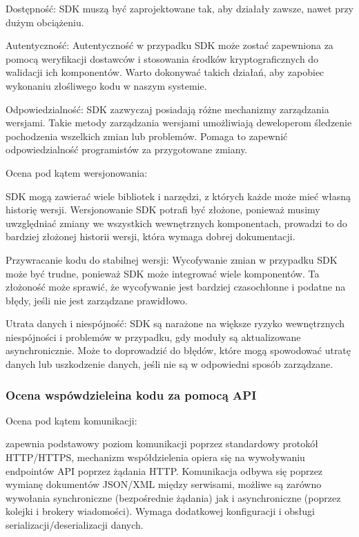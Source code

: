 \documentclass[runningheads,12pt]{llncs}
\begin{document}
Dostępność: SDK muszą być zaprojektowane tak, aby działały zawsze, nawet przy dużym obciążeniu. ~\cite[para 6]{azure2020}

Autentyczność: Autentyczność w przypadku SDK może zostać zapewniona za pomocą weryfikacji dostawców i stosowania środków kryptograficznych do walidacji ich komponentów. Warto dokonywać takich działań, aby zapobiec wykonaniu złośliwego kodu w naszym systemie. ~\cite[para 7]{azure2020}

Odpowiedzialność: SDK zazwyczaj posiadają różne mechanizmy zarządzania wersjami. Takie metody zarządzania wersjami umożliwiają deweloperom śledzenie pochodzenia wszelkich zmian lub problemów. Pomaga to zapewnić odpowiedzialność programistów za przygotowane zmiany. ~\cite[para 7]{azure2020}

Ocena pod kątem wersjonowania:

SDK mogą zawierać wiele bibliotek i narzędzi, z których każde może mieć własną historię wersji. Wersjonowanie SDK potrafi być złożone, ponieważ musimy uwzględniać zmiany we wszystkich wewnętrznych komponentach, prowadzi to do bardziej złożonej historii wersji, która wymaga dobrej dokumentacji. ~\cite[para. 3]{azure2020}

Przywracanie kodu do stabilnej wersji: Wycofywanie zmian w przypadku SDK może być trudne, ponieważ SDK może integrować wiele komponentów. Ta złożoność może sprawić, że wycofywanie jest bardziej czasochłonne i podatne na błędy, jeśli nie jest zarządzane prawidłowo. ~\cite[para. 3]{azure2020}

Utrata danych i niespójność: SDK są narażone na większe ryzyko wewnętrznych niespójności i problemów w przypadku, gdy moduły są aktualizowane asynchronicznie. Może to doprowadzić do błędów, które mogą spowodować utratę danych lub uszkodzenie danych, jeśli nie są w odpowiedni sposób zarządzane. ~\cite[para. 3]{azure2020}
\subsubsection{Ocena wspówdzieleina kodu za pomocą API}

Ocena pod kątem komunikacji: 

zapewnia podstawowy poziom komunikacji poprzez standardowy protokół HTTP/HTTPS, mechanizm współdzielenia opiera się na wywoływaniu endpointów API poprzez żądania HTTP. Komunikacja odbywa się poprzez wymianę dokumentów JSON/XML między serwisami, możliwe są zarówno wywołania synchroniczne (bezpośrednie żądania) jak i asynchroniczne (poprzez kolejki i brokery wiadomości). Wymaga dodatkowej konfiguracji i obsługi serializacji/deserializacji danych.
\end{document}
